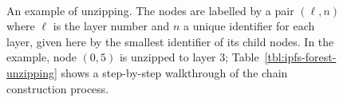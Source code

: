 \documentclass[10pt,twocolumn,twoside]{IEEEtran}
\newenvironment{stusubfig}[1]
{
	\begin{figure}[#1]
	\begin{center}
}
{
	\end{center}
	\end{figure}
}
\begin{document}
\begin{stusubfig}{p}
	\hspace{8mm}%
	\\
	\hspace{8mm}%
\caption{An example of unzipping. The nodes are labelled by a pair $(\ell,n)$ where $\ell$ is the layer number and $n$ a unique identifier for each layer, given here by the smallest identifier of its child nodes. In the example, node $(0,5)$ is unzipped to layer $3$; Table~\ref{tbl:ipfs-forest-unzipping} shows a step-by-step walkthrough of the chain construction process.}
\label{fig:ipfs-forest-unzipping}
\end{stusubfig}
\end{document}
